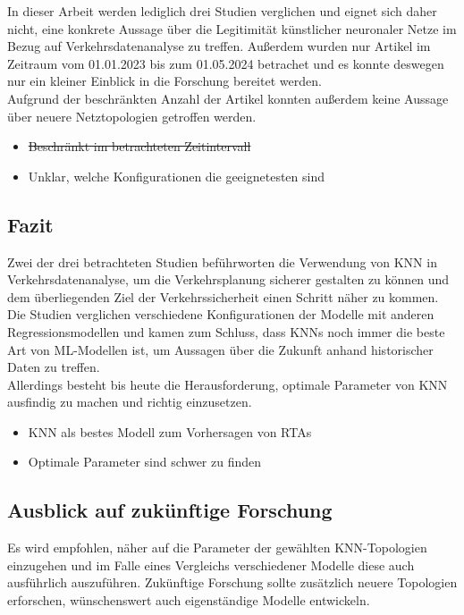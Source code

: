 \documentclass{scrartcl}
\begin{document}
In dieser Arbeit werden lediglich drei Studien verglichen und eignet sich
daher nicht, eine konkrete Aussage über die Legitimität künstlicher neuronaler
Netze im Bezug auf Verkehrsdatenanalyse zu treffen. Außerdem wurden nur
Artikel im Zeitraum vom 01.01.2023 bis zum 01.05.2024 betrachet und 
es konnte deswegen nur ein kleiner Einblick in die Forschung bereitet werden.
\medskip \\
Aufgrund der beschränkten Anzahl der Artikel konnten außerdem keine Aussage
über neuere Netztopologien getroffen werden.

\begin{itemize}
   \item{\sout{Beschränkt im betrachteten Zeitintervall}}
   \item{Unklar, welche Konfigurationen die geeignetesten sind}
\end{itemize}

\subsection{Fazit}

Zwei der drei betrachteten Studien beführworten die Verwendung von KNN in
Verkehrsdatenanalyse, um die Verkehrsplanung sicherer gestalten zu können 
und dem überliegenden Ziel der Verkehrssicherheit einen Schritt näher zu kommen.
Die Studien verglichen verschiedene Konfigurationen der Modelle mit anderen 
Regressionsmodellen und kamen zum Schluss, dass KNNs noch immer die beste
Art von ML-Modellen ist, um Aussagen über die Zukunft anhand historischer
Daten zu treffen.
\medskip \\
Allerdings besteht bis heute die Herausforderung, optimale Parameter von
KNN ausfindig zu machen und richtig einzusetzen.

\begin{itemize}
   \item{KNN als bestes Modell zum Vorhersagen von RTAs}
   \item{Optimale Parameter sind schwer zu finden}
\end{itemize}

\subsection{Ausblick auf zukünftige Forschung}

Es wird empfohlen, näher auf die Parameter der gewählten KNN-Topologien
einzugehen und im Falle eines Vergleichs verschiedener Modelle diese auch
ausführlich auszuführen. Zukünftige Forschung sollte zusätzlich neuere
Topologien erforschen, wünschenswert auch eigenständige Modelle entwickeln.

\printbibliography
\listoffigures
\listoftables
\end{document}
